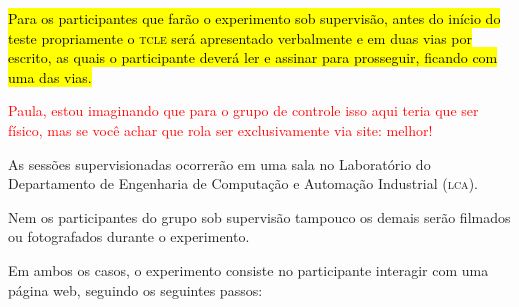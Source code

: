 \documentclass[a4paper,11pt,titlepage,singlespacing]{article}
\newcommand\todo[1]{\textcolor{red}{#1}}
\begin{document}
\hl{Para os participantes que farão o experimento sob supervisão, antes do início do teste propriamente o \textsc{tcle} será apresentado verbalmente e em duas vias por escrito, as quais o participante deverá ler e assinar para prosseguir, ficando com uma das vias.}

\todo{Paula, estou imaginando que para o grupo de controle isso aqui teria que ser físico, mas se você achar que rola ser exclusivamente via site: melhor!}

As sessões supervisionadas ocorrerão em uma sala no Laboratório do Departamento de Engenharia de Computação e Automação Industrial (\textsc{lca}).

Nem os participantes do grupo sob supervisão tampouco os demais serão filmados ou fotografados durante o experimento.

Em ambos os casos, o experimento consiste no participante interagir com uma página web, seguindo os seguintes passos:
\end{document}
